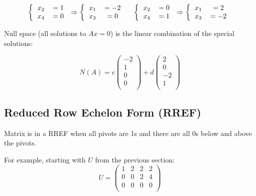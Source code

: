 \documentclass[12pt]{article}
\begin{document}
\[ 
\left \{
  \begin{tabular}{cc}
  $x_2$ & $=1$\\
  $x_4$ & $=0$\\
  \end{tabular}
\right
.\Rightarrow
\left \{
  \begin{tabular}{cc}
  $x_1$ & $=-2$\\
  $x_3$ & $=0$\\
  \end{tabular}
\right
.\quad
\left \{
  \begin{tabular}{cc}
  $x_2$ & $=0$\\
  $x_4$ & $=1$\\
  \end{tabular}
\right
.\Rightarrow
\left \{
  \begin{tabular}{cc}
  $x_1$ & $=2$\\
  $x_3$ & $=-2$\\
  \end{tabular}
\right
.\]

Null space (all solutions to $Ax=0$) is the linear combination of the special solutions:

\[
N(A)=c
\left(
    \begin{matrix}
        -2\\
        1\\
        0\\
        0\\
    \end{matrix}
\right)
+d
\left(
    \begin{matrix}
        2\\
        0\\
        -2\\
        1\\
    \end{matrix}
\right)
\]

\subsection{Reduced Row Echelon Form (RREF)}

Matrix is in a RREF when all pivots are 1s and there are all 0s below and above the pivots.

For example, starting with $U$ from the previous section:
\[
U=
\left(
    \begin{matrix}
        \boxed{1} & 2 & 2 & 2\\
        0 & 0 & \boxed{2} & 4\\
        0 & 0 & 0 & 0\\
    \end{matrix}
\right)
\]
\end{document}
